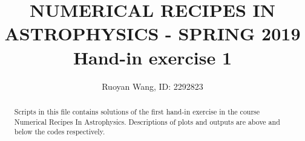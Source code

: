 \documentclass[a4paper,12pt]{article}
\title{NUMERICAL RECIPES IN ASTROPHYSICS - SPRING 2019 \\
	\vspace{5mm} \large Hand-in exercise 1 }
\author{Ruoyan Wang, ID: 2292823}
\begin{document}
\maketitle

\begin{abstract}
Scripts in this file contains solutions of the first hand-in exercise in the course Numerical Recipes In Astrophysics. Descriptions of plots and outputs are above and below the codes respectively. 
\end{abstract}











\end{document}
